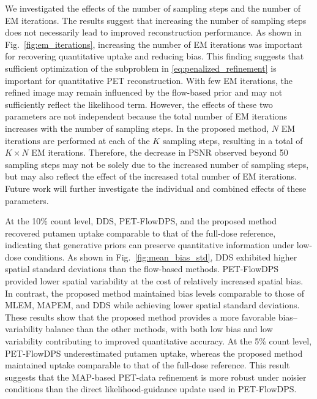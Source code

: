 \documentclass[journal]{IEEEtran}
\begin{document}
We investigated the effects of the number of sampling steps and the number of EM iterations. The results suggest that increasing the number of sampling steps does not necessarily lead to improved reconstruction performance. As shown in Fig.~\ref{fig:em_iterations}, increasing the number of EM iterations was important for recovering quantitative uptake and reducing bias. This finding suggests that sufficient optimization of the subproblem in \eqref{eq:penalized_refinement} is important for quantitative PET reconstruction. With few EM iterations, the refined image may remain influenced by the flow-based prior and may not sufficiently reflect the likelihood term. However, the effects of these two parameters are not independent because the total number of EM iterations increases with the number of sampling steps. In the proposed method, $N$ EM iterations are performed at each of the $K$ sampling steps, resulting in a total of $K\times N$ EM iterations. Therefore, the decrease in PSNR observed beyond 50 sampling steps may not be solely due to the increased number of sampling steps, but may also reflect the effect of the increased total number of EM iterations. Future work will further investigate the individual and combined effects of these parameters.

At the 10\% count level, DDS, PET-FlowDPS, and the proposed method recovered putamen uptake comparable to that of the full-dose reference, indicating that generative priors can preserve quantitative information under low-dose conditions. As shown in Fig.~\ref{fig:mean_bias_std}, DDS exhibited higher spatial standard deviations than the flow-based methods. PET-FlowDPS provided lower spatial variability at the cost of relatively increased spatial bias. In contrast, the proposed method maintained bias levels comparable to those of MLEM, MAPEM, and DDS while achieving lower spatial standard deviations. These results show that the proposed method provides a more favorable bias--variability balance than the other methods, with both low bias and low variability contributing to improved quantitative accuracy. At the 5\% count level, PET-FlowDPS underestimated putamen uptake, whereas the proposed method maintained uptake comparable to that of the full-dose reference. This result suggests that the MAP-based PET-data refinement is more robust under noisier conditions than the direct likelihood-guidance update used in PET-FlowDPS.
\end{document}
